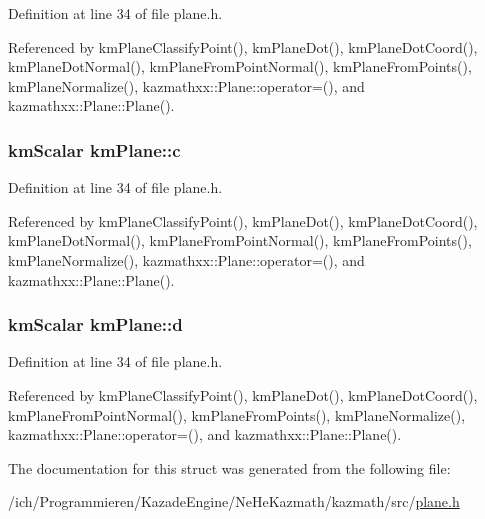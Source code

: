 Definition at line 34 of file plane.h.

Referenced by kmPlaneClassifyPoint(), kmPlaneDot(), kmPlaneDotCoord(), kmPlaneDotNormal(), kmPlaneFromPointNormal(), kmPlaneFromPoints(), kmPlaneNormalize(), kazmathxx::Plane::operator=(), and kazmathxx::Plane::Plane().\hypertarget{structkm_plane_46fb82aee3e4ccec7bb027ba53998600}{
\subsubsection[c]{\setlength{\rightskip}{0pt plus 5cm}kmScalar {\bf kmPlane::c}}}
\label{structkm_plane_46fb82aee3e4ccec7bb027ba53998600}




Definition at line 34 of file plane.h.

Referenced by kmPlaneClassifyPoint(), kmPlaneDot(), kmPlaneDotCoord(), kmPlaneDotNormal(), kmPlaneFromPointNormal(), kmPlaneFromPoints(), kmPlaneNormalize(), kazmathxx::Plane::operator=(), and kazmathxx::Plane::Plane().\hypertarget{structkm_plane_a3c74528242125229ab0038e9a09b803}{
\subsubsection[d]{\setlength{\rightskip}{0pt plus 5cm}kmScalar {\bf kmPlane::d}}}
\label{structkm_plane_a3c74528242125229ab0038e9a09b803}




Definition at line 34 of file plane.h.

Referenced by kmPlaneClassifyPoint(), kmPlaneDot(), kmPlaneDotCoord(), kmPlaneFromPointNormal(), kmPlaneFromPoints(), kmPlaneNormalize(), kazmathxx::Plane::operator=(), and kazmathxx::Plane::Plane().

The documentation for this struct was generated from the following file:\begin{CompactItemize}
\item 
/ich/Programmieren/KazadeEngine/NeHeKazmath/kazmath/src/\hyperlink{plane_8h}{plane.h}\end{CompactItemize}
